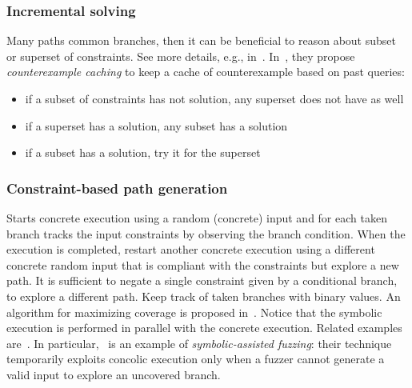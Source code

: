 \subsubsection{Incremental solving} Many paths common branches, then it can be beneficial to reason about subset or superset of constraints. See more details, e.g., in~\cite{KLEE-OSDI08,CUTE-FSE13}. In~\cite{KLEE-OSDI08}, they propose {\em counterexample caching} to keep a cache of counterexample based on past queries:
      \begin{itemize}
        \item if a subset of constraints has not solution, any superset does not have as well
        \item if a superset has a solution, any subset has a solution
        \item if a subset has a solution, try it for the superset
      \end{itemize}


\subsubsection{Constraint-based path generation}
Starts concrete execution using a random (concrete) input and for each taken branch tracks the input constraints by observing the branch condition. When the execution is completed, restart another concrete execution using a different concrete random input that is compliant with the constraints but explore a new path. It is sufficient to negate a single constraint given by a conditional branch, to explore a different path. Keep track of taken branches with binary values. An algorithm for maximizing coverage is proposed in~\cite{DART-PLDI05}. Notice that the symbolic execution is performed in parallel with the concrete execution. Related examples are~\cite{SAGE-NDSS08,DRILLER-NDSS16}. In particular,~\cite{DRILLER-NDSS16} is an example of {\em symbolic-assisted fuzzing}: their technique temporarily exploits concolic execution only when a fuzzer cannot generate a valid input to explore an uncovered branch.

